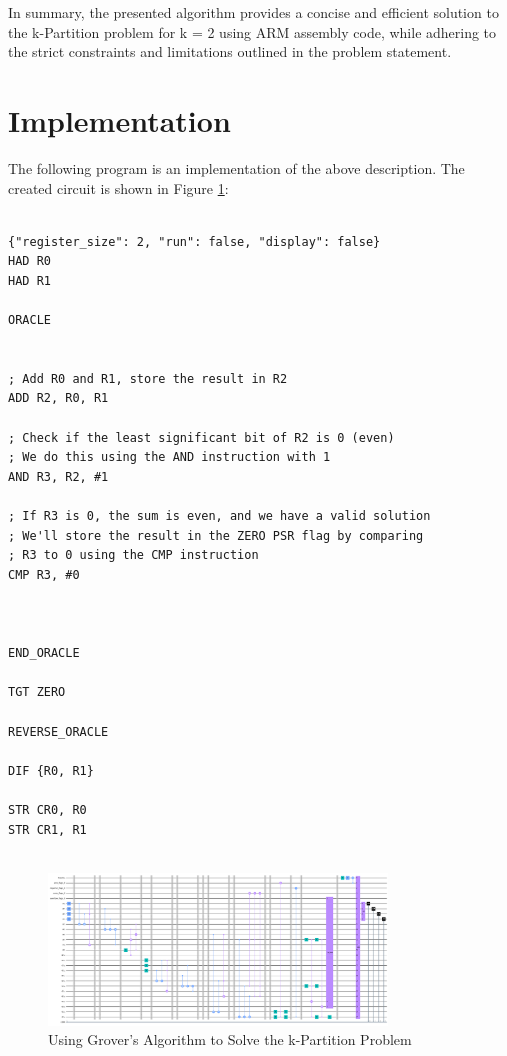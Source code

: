 In summary, the presented algorithm provides a concise and efficient solution to the k-Partition problem for k = 2 using ARM assembly code, while adhering to the strict constraints and limitations outlined in the problem statement.



\section{Implementation}

The following program is an implementation of the above description. The created circuit is shown in Figure \ref{fig:k-Partition}:

\begin{lstlisting}

{"register_size": 2, "run": false, "display": false}
HAD R0
HAD R1

ORACLE


; Add R0 and R1, store the result in R2
ADD R2, R0, R1

; Check if the least significant bit of R2 is 0 (even)
; We do this using the AND instruction with 1
AND R3, R2, #1

; If R3 is 0, the sum is even, and we have a valid solution
; We'll store the result in the ZERO PSR flag by comparing
; R3 to 0 using the CMP instruction
CMP R3, #0



END_ORACLE

TGT ZERO

REVERSE_ORACLE

DIF {R0, R1}

STR CR0, R0
STR CR1, R1


\end{lstlisting}

\begin{figure}[htp]
    \centering
    \includegraphics[width=9cm]{Figures/k-Partition_circuit.png}
    \caption{Using Grover's Algorithm to Solve the k-Partition Problem}
    \label{fig:k-Partition}
\end{figure}

